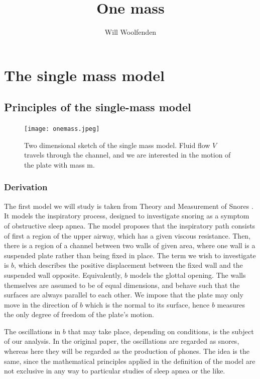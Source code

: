 \documentclass{report}
\title{One mass}
\author{Will Woolfenden}
\begin{document}
\maketitle

\chapter{The single mass model}

\section{Principles of the single-mass model}

\begin{figure}[h]
	\centering
	\texttt{[image: onemass.jpeg]}
	\caption{
		Two dimensional sketch of the single mass model.
		Fluid flow $V$ travels through the channel,
		and we are interested in the motion of the plate with mass $\mathrm{m}$.
	}
\end{figure}

\subsection{Derivation}

The first model we will study is taken from Theory and Measurement of Snores \citep{gavriely_jensen_1993}.
It models the inspiratory process, designed to investigate snoring as a symptom of obstructive sleep apnea.
The model proposes that the inspiratory path consists of first a region of the upper airway,
which has a given viscous resistance.
Then, there is a region of a channel between two walls of given area, where one wall is a suspended plate rather than being fixed in place.
The term we wish to investigate is $b$, which describes the positive displacement between the fixed wall and the suspended wall opposite.
Equivalently, $b$ models the glottal opening.
The walls themselves are assumed to be of equal dimensions, and behave such that the surfaces are always parallel to each other.
We impose that the plate may only move in the direction of $b$ which is the normal to its surface,
hence $b$ measures the only degree of freedom of the plate's motion.


The oscillations in $b$ that may take place, depending on conditions, is the subject of our analysis.
In the original paper, the oscillations are regarded as snores,
whereas here they will be regarded as the production of phones.
The idea is the same, since the mathematical principles applied in the definition of the model are not exclusive in any way to particular studies of sleep apnea or the like.
\end{document}
